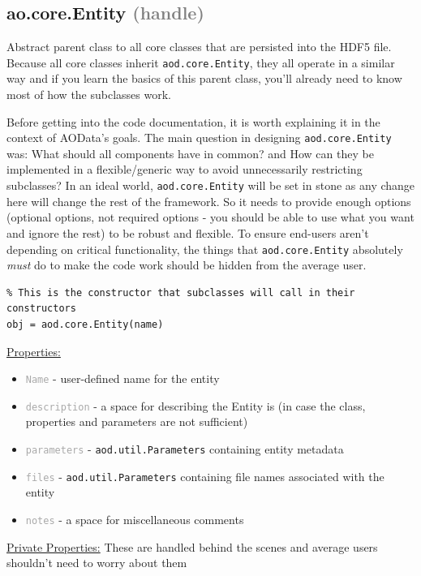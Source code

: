 \documentclass[10pt]{exam}
\newcommand\aodclass[1]{\textcolor{codeblue}{\texttt{#1}}}
\newcommand\aodprop[1]{\textcolor{darkgray}{\texttt{#1}}}
\newcommand\docheader[1]{\vspace{0.6ex}\noindent\underline{#1}\vspace{0.15ex}}
\begin{document}
	\subsection{ao.core.Entity \textcolor{gray}{(handle)}}
		\label{subsection:EntityDoc}
		\noindent  Abstract parent class to all core classes that are persisted into the HDF5 file. Because all core classes inherit \aodclass{aod.core.Entity}, they all operate in a similar way and if you learn the basics of this parent class, you'll already need to know most of how the subclasses work.
		
		Before getting into the code documentation, it is worth explaining it in the context of AOData's goals. The main question in designing \aodclass{aod.core.Entity} was: What should all components have in common? and How can they be implemented in a flexible/generic way to avoid unnecessarily restricting subclasses? In an ideal world, \aodclass{aod.core.Entity} will be set in stone as any change here will change the rest of the framework. So it needs to provide enough options (optional options, not required options - you should be able to use what you want and ignore the rest) to be robust and flexible. To ensure end-users aren't depending on critical functionality, the things that \aodclass{aod.core.Entity} absolutely \textit{must} do to make the code work should be hidden from the average user.  
		\begin{lstlisting}[style=matlab-editor, basicstyle=\mlttfamily\footnotesize]
% Note that aod.core.Entity is abstract and never directly instantiated.
% This is the constructor that subclasses will call in their constructors
obj = aod.core.Entity(name)
		\end{lstlisting}
		\docheader{Properties:} 
		\begin{itemize}
			\item \aodprop{Name} - user-defined name for the entity
			\item \aodprop{description} - a space for describing the Entity is (in case the class, properties and parameters are not sufficient)
			\item \aodprop{parameters} - \aodclass{aod.util.Parameters} containing entity metadata
			\item \aodprop{files} - \aodclass{aod.util.Parameters} containing file names associated with the entity
			\item \aodprop{notes} - a space for miscellaneous comments
		\end{itemize}
		\docheader{Private Properties:} These are handled behind the scenes and average users shouldn't need to worry about them
\end{document}
